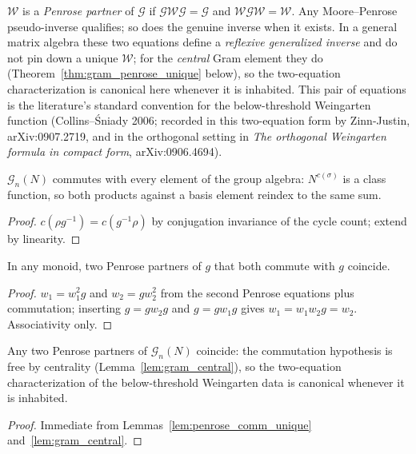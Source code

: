 \begin{definition}\label{def:penrose_pair}
\leanok
{}
$\mathcal W$ is a \emph{Penrose partner} of $\mathcal G$ if
$\mathcal G\mathcal W\mathcal G=\mathcal G$ and
$\mathcal W\mathcal G\mathcal W=\mathcal W$. Any Moore--Penrose
pseudo-inverse qualifies; so does the genuine inverse when it exists. In
a general matrix algebra these two equations define a \emph{reflexive
generalized inverse} and do not pin down a unique $\mathcal W$; for the
\emph{central} Gram element they do
(Theorem~\ref{thm:gram_penrose_unique} below), so the two-equation
characterization is canonical here whenever it is inhabited.
This pair of equations is the literature's standard convention for the
below-threshold Weingarten function (Collins--\'Sniady 2006; recorded in
this two-equation form by Zinn-Justin, arXiv:0907.2719, and in the
orthogonal setting in \emph{The orthogonal Weingarten formula in compact
form}, arXiv:0906.4694).
\end{definition}

\begin{lemma}\label{lem:gram_central}
\leanok
{}
$\mathcal G_n(N)$ commutes with every element of the group algebra:
$N^{c(\sigma)}$ is a class function, so both products against a basis
element reindex to the same sum.
\end{lemma}
\begin{proof}
\leanok
{}
$c(\rho g^{-1}) = c(g^{-1}\rho)$ by conjugation invariance of the cycle
count; extend by linearity.
\end{proof}

\begin{lemma}\label{lem:penrose_comm_unique}
\leanok
{}
In any monoid, two Penrose partners of $g$ that both commute with $g$
coincide.
\end{lemma}
\begin{proof}
\leanok
$w_1 = w_1^2 g$ and $w_2 = g w_2^2$ from the second Penrose equations
plus commutation; inserting $g = g w_2 g$ and $g = g w_1 g$ gives
$w_1 = w_1 w_2 g = w_2$. Associativity only.
\end{proof}

\begin{theorem}\label{thm:gram_penrose_unique}
\leanok
{}
Any two Penrose partners of $\mathcal G_n(N)$ coincide: the commutation
hypothesis is free by centrality (Lemma~\ref{lem:gram_central}), so the
two-equation characterization of the below-threshold Weingarten data is
canonical whenever it is inhabited.
\end{theorem}
\begin{proof}
\leanok
{}
Immediate from Lemmas~\ref{lem:penrose_comm_unique}
and~\ref{lem:gram_central}.
\end{proof}

